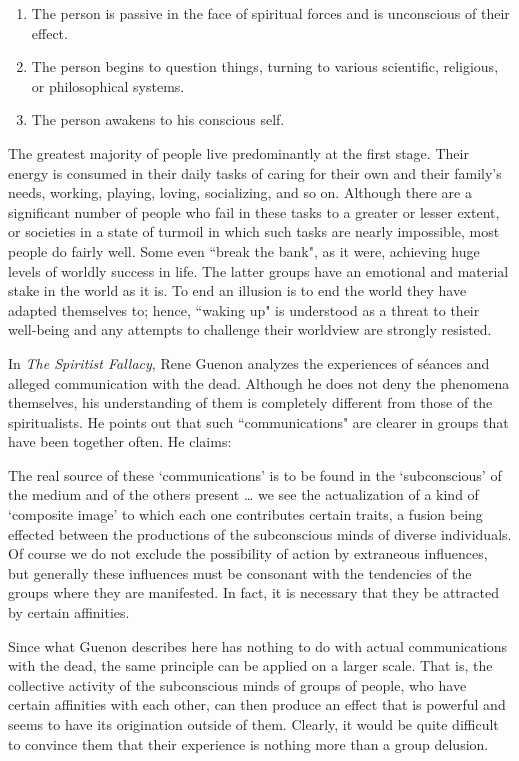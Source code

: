 \begin{enumerate}
\item The person is passive in the face of spiritual forces and is unconscious of their effect. 
\item The person begins to question things, turning to various scientific, religious, or philosophical systems. 
\item The person awakens to his conscious self. 
\end{enumerate}
The greatest majority of people live predominantly at the first stage. Their energy is consumed in their daily tasks of caring for their own and their family's needs, working, playing, loving, socializing, and so on. Although there are a significant number of people who fail in these tasks to a greater or lesser extent, or societies in a state of turmoil in which such tasks are nearly impossible, most people do fairly well. Some even ``break the bank", as it were, achieving huge levels of worldly success in life. The latter groups have an emotional and material stake in the world as it is. To end an illusion is to end the world they have adapted themselves to; hence, ``waking up" is understood as a threat to their well-being and any attempts to challenge their worldview are strongly resisted.

In \textit{The Spiritist Fallacy}, Rene Guenon analyzes the experiences of séances and alleged communication with the dead. Although he does not deny the phenomena themselves, his understanding of them is completely different from those of the spiritualists. He points out that such ``communications" are clearer in groups that have been together often. He claims:

\begin{quotex}
The real source of these `communications' is to be found in the `subconscious' of the medium and of the others present … we see the actualization of a kind of `composite image' to which each one contributes certain traits, a fusion being effected between the productions of the subconscious minds of diverse individuals. Of course we do not exclude the possibility of action by extraneous influences, but generally these influences must be consonant with the tendencies of the groups where they are manifested. In fact, it is necessary that they be attracted by certain affinities. 

\end{quotex}
Since what Guenon describes here has nothing to do with actual communications with the dead, the same principle can be applied on a larger scale. That is, the collective activity of the subconscious minds of groups of people, who have certain affinities with each other, can then produce an effect that is powerful and seems to have its origination outside of them. Clearly, it would be quite difficult to convince them that their experience is nothing more than a group delusion.

